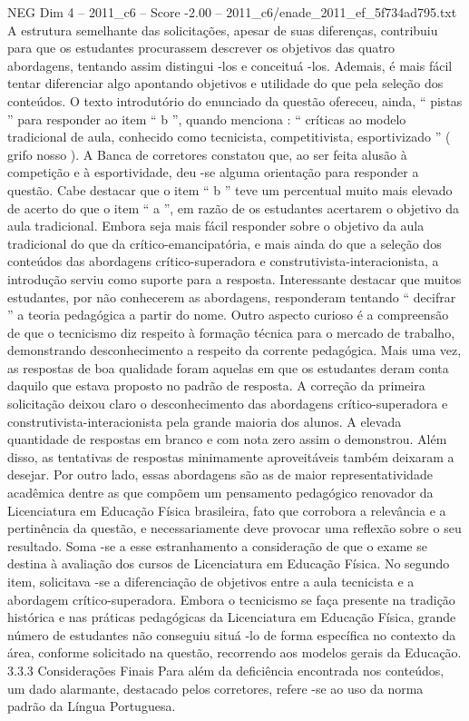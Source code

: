 \begin{textsample}{NEG Dim 4 – 2011\_c6 – Score -2.00 – 2011\_c6/enade\_2011\_ef\_5f734ad795.txt}
A estrutura semelhante das solicitações, apesar de suas diferenças, contribuiu para que os estudantes procurassem descrever os objetivos das quatro abordagens, tentando assim distingui -los e conceituá -los.
Ademais, é mais fácil tentar diferenciar algo apontando objetivos e utilidade do que pela seleção dos conteúdos.
O texto introdutório do enunciado da questão ofereceu, ainda, “ pistas ” para responder ao item “ b ”, quando menciona : “ críticas ao modelo tradicional de aula, conhecido como tecnicista, competitivista, esportivizado ” ( grifo nosso ).
A Banca de corretores constatou que, ao ser feita alusão à competição e à esportividade, deu -se alguma orientação para responder a questão.
Cabe destacar que o item “ b ” teve um percentual muito mais elevado de acerto do que o item “ a ”, em razão de os estudantes acertarem o objetivo da aula tradicional.
Embora seja mais fácil responder sobre o objetivo da aula tradicional do que da crítico-emancipatória, e mais ainda do que a seleção dos conteúdos das abordagens crítico-superadora e construtivista-interacionista, a introdução serviu como suporte para a resposta.
Interessante destacar que muitos estudantes, por não conhecerem as abordagens, responderam tentando “ decifrar ” a teoria pedagógica a partir do nome.
Outro aspecto curioso é a compreensão de que o tecnicismo diz respeito à formação técnica para o mercado de trabalho, demonstrando desconhecimento a respeito da corrente pedagógica.
Mais uma vez, as respostas de boa qualidade foram aquelas em que os estudantes deram conta daquilo que estava proposto no padrão de resposta.
A correção da primeira solicitação deixou claro o desconhecimento das abordagens crítico-superadora e construtivista-interacionista pela grande maioria dos alunos.
A elevada quantidade de respostas em branco e com nota zero assim o demonstrou.
Além disso, as tentativas de respostas minimamente aproveitáveis também deixaram a desejar.
Por outro lado, essas abordagens são as de maior representatividade acadêmica dentre as que compõem um pensamento pedagógico renovador da Licenciatura em Educação Física brasileira, fato que corrobora a relevância e a pertinência da questão, e necessariamente deve provocar uma reflexão sobre o seu resultado.
Soma -se a esse estranhamento a consideração de que o exame se destina à avaliação dos cursos de Licenciatura em Educação Física.
No segundo item, solicitava -se a diferenciação de objetivos entre a aula tecnicista e a abordagem crítico-superadora.
Embora o tecnicismo se faça presente na tradição histórica e nas práticas pedagógicas da Licenciatura em Educação Física, grande número de estudantes não conseguiu situá -lo de forma específica no contexto da área, conforme solicitado na questão, recorrendo aos modelos gerais da Educação. 3.3.3 Considerações Finais Para além da deficiência encontrada nos conteúdos, um dado alarmante, destacado pelos corretores, refere -se ao uso da norma padrão da Língua Portuguesa.

\end{textsample}
